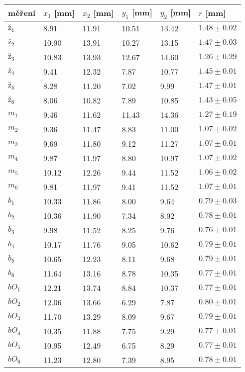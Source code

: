 \documentclass[a4paper]{article}
\begin{document}
\begin{center}
     \label{tab:title}
    \begin{tabular}{ | l | l | l | l | l | p{3cm} |} \hline
    měření & $x_{1}$ [mm]    & $x_{2}$ [mm]   & $y_{1}$ [mm] & $y_{2}$ [mm] & $r$ [mm]  \\ \hline
    $\textit{ž}_{1}$       & 8.91  & 11.91 & 10.51 & 13.42 & $1.48\pm0.02$ \\ \hline
    $\textit{ž}_{2}$       & 10.90 & 13.91 & 10.27 & 13.15 & $1.47\pm0.03$ \\ \hline
    $\textit{ž}_{3}$       & 10.83 & 13.93 & 12.67 & 14.60 & $1.26\pm0.29$ \\ \hline
    $\textit{ž}_{4}$       & 9.41  & 12.32 & 7.87  & 10.77 & $1.45\pm0.01$ \\ \hline
    $\textit{ž}_{5}$       & 8.28  & 11.20 & 7.02  & 9.99  & $1.47\pm0.01$ \\ \hline
    $\textit{ž}_{6}$       & 8.06  & 10.82 & 7.89  & 10.85 & $1.43\pm0.05$ \\ \hline
    $m_{1}$       & 9.46  & 11.62 & 11.43 & 14.36 & $1.27\pm0.19$ \\ \hline
    $m_{2}$       & 9.36  & 11.47 & 8.83  & 11.00 & $1.07\pm0.02$ \\ \hline
    $m_{3}$       & 9.69  & 11.80 & 9.12  & 11.27 & $1.07\pm0.01$ \\ \hline
    $m_{4}$       & 9.87  & 11.97 & 8.80  & 10.97 & $1.07\pm0.02$ \\ \hline
    $m_{5}$       & 10.12 & 12.26 & 9.44  & 11.52 & $1.06\pm0.02$ \\ \hline
    $m_{6}$       & 9.81  & 11.97 & 9.41  & 11.52 & $1.07\pm0.01$ \\ \hline
    $b_{1}$       & 10.33 & 11.86 & 8.00  & 9.64  & $0.79\pm0.03$ \\ \hline
    $b_{2}$       & 10.36 & 11.90 & 7.34  & 8.92  & $0.78\pm0.01$ \\ \hline
    $b_{3}$       & 9.98  & 11.52 & 8.25  & 9.76  & $0.76\pm0.01$ \\ \hline
    $b_{4}$       & 10.17 & 11.76 & 9.05  & 10.62 & $0.79\pm0.01$ \\ \hline
    $b_{5}$       & 10.65 & 12.23 & 8.11  & 9.68  & $0.79\pm0.01$ \\ \hline
    $b_{6}$       & 11.64 & 13.16 & 8.78  & 10.35 & $0.77\pm0.01$ \\ \hline
    $bO_{1}$      & 12.21 & 13.74 & 8.84  & 10.37 & $0.77\pm0.01$ \\ \hline
    $bO_{2}$      & 12.06 & 13.66 & 6.29  & 7.87  & $0.80\pm0.01$ \\ \hline
    $bO_{3}$      & 11.70 & 13.29 & 8.09  & 9.67  & $0.79\pm0.01$ \\ \hline
    $bO_{4}$      & 10.35 & 11.88 & 7.75  & 9.29  & $0.77\pm0.01$ \\ \hline
    $bO_{5}$      & 10.95 & 12.49 & 6.75  & 8.29  & $0.77\pm0.01$ \\ \hline
    $bO_{6}$      & 11.23 &	12.80 &	7.39  &	8.95  & $0.78\pm0.01$ \\ \hline
    \end{tabular}
\end{center}
\end{document}
